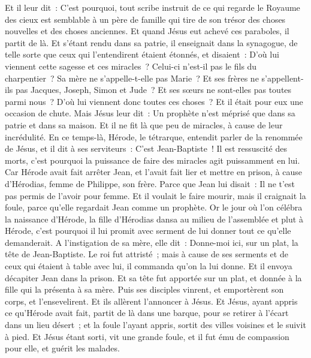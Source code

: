 \begin{multicols}{2}
Et il leur dit~: C'est pourquoi, tout scribe instruit de ce qui regarde le Royaume des cieux est semblable à un père de famille qui tire de son trésor des choses nouvelles et des choses anciennes.
Et quand Jésus eut achevé ces paraboles, il partit de là.
Et s'étant rendu dans sa patrie, il enseignait dans la synagogue, de telle sorte que ceux qui l'entendirent étaient étonnés, et disaient~: D'où lui viennent cette sagesse et ces miracles~?
Celui-ci n'est-il pas le fils du charpentier~? Sa mère ne s'appelle-t-elle pas Marie~? Et ses frères ne s'appellent-ils pas Jacques, Joseph, Simon et Jude~?
Et ses sœurs ne sont-elles pas toutes parmi nous~? D'où lui viennent donc toutes ces choses~?
Et il était pour eux une occasion de chute. Mais Jésus leur dit~: Un prophète n'est méprisé que dans sa patrie et dans sa maison.
Et il ne fit là que peu de miracles, à cause de leur incrédulité.
\VerseOne{}En ce temps-là, Hérode, le tétrarque, entendit parler de la renommée de Jésus, et il dit à ses serviteurs~: C'est Jean-Baptiste~!
Il est ressuscité des morts, c'est pourquoi la puissance de faire des miracles agit puissamment en lui.
Car Hérode avait fait arrêter Jean, et l'avait fait lier et mettre en prison, à cause d'Hérodias, femme de Philippe, son frère.
Parce que Jean lui disait~: Il ne t'est pas permis de l'avoir pour femme.
Et il voulait le faire mourir, mais il craignait la foule, parce qu'elle regardait Jean comme un prophète.
Or le jour où l'on célébra la naissance d'Hérode, la fille d'Hérodias dansa au milieu de l'assemblée et plut à Hérode,
c'est pourquoi il lui promit avec serment de lui donner tout ce qu'elle demanderait.
A l'instigation de sa mère, elle dit~: Donne-moi ici, sur un plat, la tête de Jean-Baptiste.
Le roi fut attristé~; mais à cause de ses serments et de ceux qui étaient à table avec lui, il commanda qu'on la lui donne.
Et il envoya décapiter Jean dans la prison.
Et sa tête fut apportée sur un plat, et donnée à la fille qui la présenta à sa mère.
Puis ses disciples vinrent, et emportèrent son corps, et l'ensevelirent. Et ils allèrent l'annoncer à Jésus.
Et Jésus, ayant appris ce qu'Hérode avait fait, partit de là dans une barque, pour se retirer à l'écart dans un lieu désert~; et la foule l'ayant appris, sortit des villes voisines et le suivit à pied.
Et Jésus étant sorti, vit une grande foule, et il fut ému de compassion pour elle, et guérit les malades.

\end{multicols}

